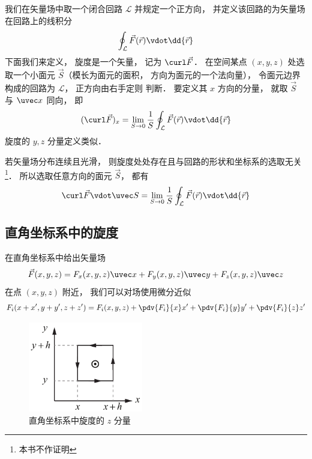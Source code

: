 
我们在矢量场中取一个闭合回路 $\mathcal L$ 并规定一个正方向， 并定义该回路的为矢量场在回路上的线积分
\begin{equation}
\oint_{\mathcal L} \vec F(\vec r) \vdot \dd{\vec r}
\end{equation}
下面我们来定义， 旋度是一个矢量， 记为 $\curl \vec F$． 在空间某点 $(x,y,z)$ 处选取一个小面元 $\vec S$（模长为面元的面积， 方向为面元的一个法向量）， 令面元边界构成的回路为 $\mathcal L$， 正方向由右手定则 判断． 要定义其 $x$ 方向的分量， 就取 $\vec S$ 与 $\uvec x$ 同向， 即
\begin{equation}
(\curl\vec F)_x = \lim_{S\to 0} \frac 1S \oint_{\mathcal L} \vec F(\vec r) \vdot \dd{\vec r}
\end{equation}
旋度的 $y, z$ 分量定义类似．

若矢量场分布连续且光滑， 则旋度处处存在且与回路的形状和坐标系的选取无关\footnote{本书不作证明}． 所以选取任意方向的面元 $\vec S$， 都有
\begin{equation}\label{Curl_eq3}
\curl\vec F \vdot \uvec S = \lim_{S\to 0} \frac 1S \oint_{\mathcal L} \vec F(\vec r) \vdot \dd{\vec r}
\end{equation}

\subsection{直角坐标系中的旋度}
在直角坐标系中给出矢量场
\begin{equation}
\vec F(x,y,z) = F_x(x,y,z)\uvec x + F_y(x,y,z)\uvec y + F_z(x,y,z)\uvec z
\end{equation}
在点 $(x,y,z)$ 附近， 我们可以对场使用微分近似
\begin{equation}
F_i(x+x', y+y', z+z') = F_i(x,y,z) + \pdv{F_i}{x}x' + \pdv{F_i}{y}y' + \pdv{F_i}{z}z'
\end{equation}

\begin{figure}[ht]
\centering
\includegraphics[width=5cm]{./figures/Curl1.pdf}
\caption{直角坐标系中旋度的 $z$ 分量} \label{Curl_fig1}
\end{figure}

